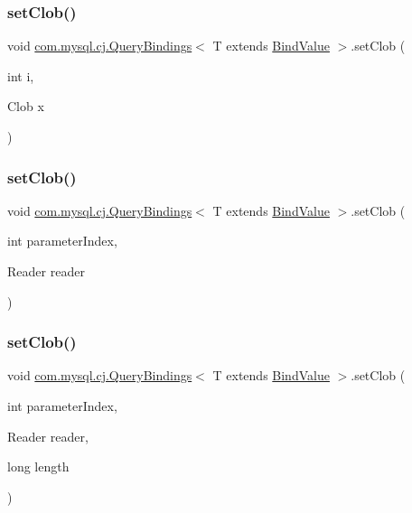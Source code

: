 \subsubsection{\texorpdfstring{set\+Clob()}{setClob()}\hspace{0.1cm}{\footnotesize\ttfamily [1/3]}}
{\footnotesize\ttfamily void \mbox{\hyperlink{interfacecom_1_1mysql_1_1cj_1_1_query_bindings}{com.\+mysql.\+cj.\+Query\+Bindings}}$<$ T extends \mbox{\hyperlink{interfacecom_1_1mysql_1_1cj_1_1_bind_value}{Bind\+Value}} $>$.set\+Clob (\begin{DoxyParamCaption}\item[{int}]{i,  }\item[{Clob}]{x }\end{DoxyParamCaption})}

\mbox{\label{interfacecom_1_1mysql_1_1cj_1_1_query_bindings_a48fdd80cf86791a397b1bcbbd9292b2c}} 
\subsubsection{\texorpdfstring{set\+Clob()}{setClob()}\hspace{0.1cm}{\footnotesize\ttfamily [2/3]}}
{\footnotesize\ttfamily void \mbox{\hyperlink{interfacecom_1_1mysql_1_1cj_1_1_query_bindings}{com.\+mysql.\+cj.\+Query\+Bindings}}$<$ T extends \mbox{\hyperlink{interfacecom_1_1mysql_1_1cj_1_1_bind_value}{Bind\+Value}} $>$.set\+Clob (\begin{DoxyParamCaption}\item[{int}]{parameter\+Index,  }\item[{Reader}]{reader }\end{DoxyParamCaption})}

\mbox{\label{interfacecom_1_1mysql_1_1cj_1_1_query_bindings_a45e48842db6bc099326134eaeb02012e}} 
\subsubsection{\texorpdfstring{set\+Clob()}{setClob()}\hspace{0.1cm}{\footnotesize\ttfamily [3/3]}}
{\footnotesize\ttfamily void \mbox{\hyperlink{interfacecom_1_1mysql_1_1cj_1_1_query_bindings}{com.\+mysql.\+cj.\+Query\+Bindings}}$<$ T extends \mbox{\hyperlink{interfacecom_1_1mysql_1_1cj_1_1_bind_value}{Bind\+Value}} $>$.set\+Clob (\begin{DoxyParamCaption}\item[{int}]{parameter\+Index,  }\item[{Reader}]{reader,  }\item[{long}]{length }\end{DoxyParamCaption})}

